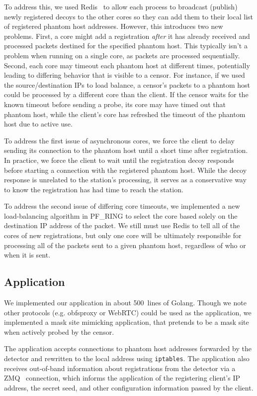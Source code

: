 \documentclass[sigconf,anonymous]{acmart}
\begin{document}
To address this, we used Redis~\cite{redis} to allow each process to broadcast
(publish) newly registered decoys to the other cores so they can
add them to their local list of registered phantom host addresses.
However, this introduces two new problems. First, a core might add a
registration \emph{after} it has already received and processed packets destined
for the specified phantom host. This typically isn't a problem when running on a
single core, as packets are processed sequentially. Second, each core may
timeout each phantom host at different times, potentially leading to differing
behavior that is visible to a censor. For instance, if we used the
source/destination IPs to load balance, a censor's packets to a phantom host could
be processed by a different core than the client. If the censor waits for the
known timeout before sending a probe, its core may have timed out that phantom host, while the client's core has refreshed the timeout of the phantom host due
to active use.

To address the first issue of asynchronous cores, we force the client to delay sending its connection
to the phantom host until a short time after registration. In practice, we force
the client to wait until the registration decoy responds before starting a
connection with the registered phantom host. While the decoy response is
unrelated to the station's processing, it serves as a conservative way to know
the registration has had time to reach the station.

To address the second issue of differing core timeouts, we implemented a new
load-balancing algorithm in
PF\_RING to select the core based solely on the destination IP address of the
packet. We still must use Redis to tell all of the cores of new
registrations, but only one core will be ultimately responsible for processing all of
the packets sent to a given phantom host, regardless of who or when it is sent.


\subsection{Application}

We implemented our application in about 500~lines of Golang. Though we note
other protocols (e.g. obfsproxy or WebRTC) could be used as the application, we
implemented a mask site mimicking application, that pretends to be a mask site
when actively probed by the censor.

The application accepts connections to phantom host addresses forwarded by the
detector and rewritten to the local address using \texttt{iptables}.
The application also receives out-of-band information about registrations from the
detector via a ZMQ~\cite{zmq} connection, which informs the application of the
registering client's IP address, the secret seed, and other configuration
information passed by the client.
\end{document}
